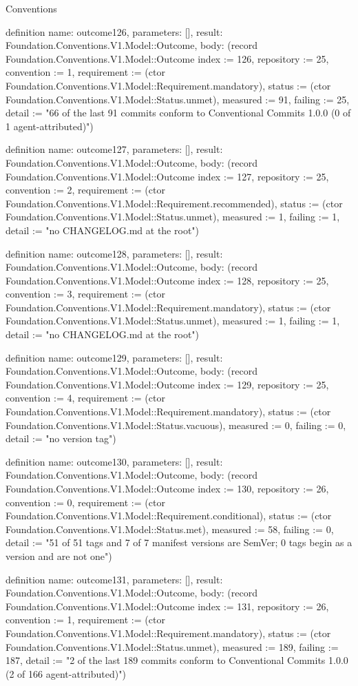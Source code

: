 \begin{lexlean}{Conventions}
\begin{semanticmodule}
definition{
  name: outcome126,
  parameters: [],
  result: Foundation.Conventions.V1.Model::Outcome,
  body: (record Foundation.Conventions.V1.Model::Outcome {index := 126, repository := 25, convention := 1, requirement := (ctor Foundation.Conventions.V1.Model::Requirement.mandatory), status := (ctor Foundation.Conventions.V1.Model::Status.unmet), measured := 91, failing := 25, detail := "66 of the last 91 commits conform to Conventional Commits 1.0.0 (0 of 1 agent-attributed)"})
}

definition{
  name: outcome127,
  parameters: [],
  result: Foundation.Conventions.V1.Model::Outcome,
  body: (record Foundation.Conventions.V1.Model::Outcome {index := 127, repository := 25, convention := 2, requirement := (ctor Foundation.Conventions.V1.Model::Requirement.recommended), status := (ctor Foundation.Conventions.V1.Model::Status.unmet), measured := 1, failing := 1, detail := "no CHANGELOG.md at the root"})
}

definition{
  name: outcome128,
  parameters: [],
  result: Foundation.Conventions.V1.Model::Outcome,
  body: (record Foundation.Conventions.V1.Model::Outcome {index := 128, repository := 25, convention := 3, requirement := (ctor Foundation.Conventions.V1.Model::Requirement.mandatory), status := (ctor Foundation.Conventions.V1.Model::Status.unmet), measured := 1, failing := 1, detail := "no CHANGELOG.md at the root"})
}

definition{
  name: outcome129,
  parameters: [],
  result: Foundation.Conventions.V1.Model::Outcome,
  body: (record Foundation.Conventions.V1.Model::Outcome {index := 129, repository := 25, convention := 4, requirement := (ctor Foundation.Conventions.V1.Model::Requirement.mandatory), status := (ctor Foundation.Conventions.V1.Model::Status.vacuous), measured := 0, failing := 0, detail := "no version tag"})
}

definition{
  name: outcome130,
  parameters: [],
  result: Foundation.Conventions.V1.Model::Outcome,
  body: (record Foundation.Conventions.V1.Model::Outcome {index := 130, repository := 26, convention := 0, requirement := (ctor Foundation.Conventions.V1.Model::Requirement.conditional), status := (ctor Foundation.Conventions.V1.Model::Status.met), measured := 58, failing := 0, detail := "51 of 51 tags and 7 of 7 manifest versions are SemVer; 0 tags begin as a version and are not one"})
}

definition{
  name: outcome131,
  parameters: [],
  result: Foundation.Conventions.V1.Model::Outcome,
  body: (record Foundation.Conventions.V1.Model::Outcome {index := 131, repository := 26, convention := 1, requirement := (ctor Foundation.Conventions.V1.Model::Requirement.mandatory), status := (ctor Foundation.Conventions.V1.Model::Status.unmet), measured := 189, failing := 187, detail := "2 of the last 189 commits conform to Conventional Commits 1.0.0 (2 of 166 agent-attributed)"})
}


\end{semanticmodule}
\end{lexlean}
